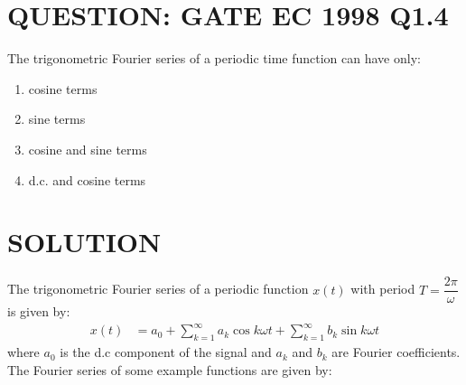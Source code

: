 \documentclass[journal,12pt,twocolumn]{IEEEtran}
\begin{document}
\section{QUESTION: GATE EC 1998 Q1.4}
The trigonometric Fourier series of a periodic time function can have only:
\begin{enumerate}[label=(\Alph*)]
\item cosine terms 
\item sine terms
\item cosine and sine terms
\item d.c. and cosine terms 
\end{enumerate}
\section{SOLUTION}
The trigonometric Fourier series of a periodic function $x(t)$ with period $T = \dfrac{2 \pi}{\omega}$ is given by:
\begin{align}
x(t) &= a_{0} + \sum_{k=1}^{\infty}a_{k}\cos{k\omega t} +\sum_{k=1}^{\infty}b_{k}\sin{k\omega t}
\end{align}
where $a_{0}$ is the d.c component of the signal and $a_{k}$ and $b_{k}$ are Fourier coefficients. The Fourier series of some example functions are given by:
\end{document}
